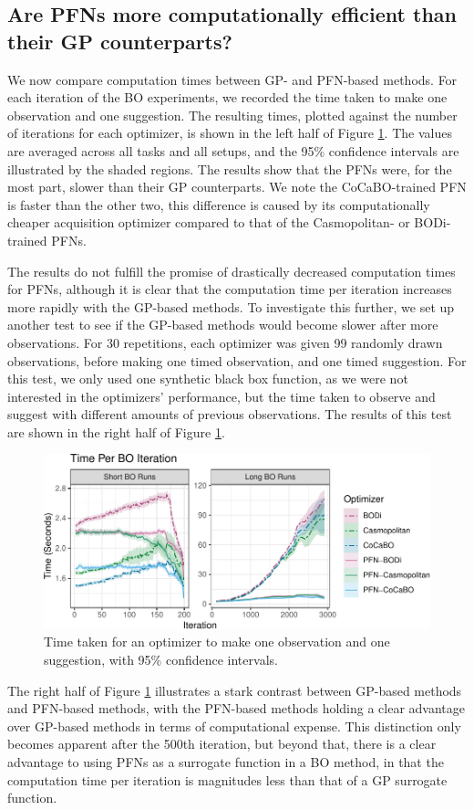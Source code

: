 \documentclass[12pt,twoside]{reedthesis}
\begin{document}
\hypertarget{rq1-3}{%
\subsection{Are PFNs more computationally efficient than their GP counterparts?}\label{rq1-3}}

We now compare computation times between GP- and PFN-based methods. For each iteration of the BO experiments, we recorded the time taken to make one observation and one suggestion. The resulting times, plotted against the number of iterations for each optimizer, is shown in the left half of Figure \ref{fig:bo-time}. The values are averaged across all tasks and all setups, and the 95\% confidence intervals are illustrated by the shaded regions. The results show that the PFNs were, for the most part, slower than their GP counterparts. We note the CoCaBO-trained PFN is faster than the other two, this difference is caused by its computationally cheaper acquisition optimizer compared to that of the Casmopolitan- or BODi-trained PFNs.

The results do not fulfill the promise of drastically decreased computation times for PFNs, although it is clear that the computation time per iteration increases more rapidly with the GP-based methods. To investigate this further, we set up another test to see if the GP-based methods would become slower after more observations. For 30 repetitions, each optimizer was given 99 randomly drawn observations, before making one timed observation, and one timed suggestion. For this test, we only used one synthetic black box function, as we were not interested in the optimizers' performance, but the time taken to observe and suggest with different amounts of previous observations. The results of this test are shown in the right half of Figure \ref{fig:bo-time}.
\begin{figure}
\centering
\includegraphics{thesis_files/figure-latex/bo-time-1.pdf}
\caption{\label{fig:bo-time}Time taken for an optimizer to make one observation and one suggestion, with 95\% confidence intervals.}
\end{figure}
The right half of Figure \ref{fig:bo-time} illustrates a stark contrast between GP-based methods and PFN-based methods, with the PFN-based methods holding a clear advantage over GP-based methods in terms of computational expense. This distinction only becomes apparent after the 500th iteration, but beyond that, there is a clear advantage to using PFNs as a surrogate function in a BO method, in that the computation time per iteration is magnitudes less than that of a GP surrogate function.
\end{document}
